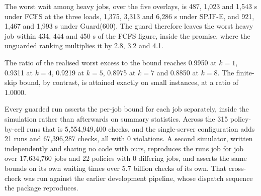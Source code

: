 \documentclass[mathematics,supfile,submit,moreauthors]{Definitions/mdpi}
\newcommand{\devnum}[1]{#1}
\begin{document}
The worst wait among heavy jobs, over the five overlays, is \devnum{487},
\devnum{1{,}023} and \devnum{1{,}543} s under FCFS at the three loads, \devnum{1{,}375},
\devnum{3{,}313} and \devnum{6{,}286} s under SPJF-E, and \devnum{921}, \devnum{1{,}467}
and \devnum{1{,}993} s under Guard($\devnum{600}$). The guard therefore leaves the worst
heavy job within \devnum{434}, \devnum{444} and \devnum{450} s of the FCFS figure, inside
the promise, where the unguarded ranking multiplies it by \devnum{2.8}, \devnum{3.2} and
\devnum{4.1}.

The ratio of the realised worst excess to the bound reaches \devnum{0.9950} at $k = 1$,
\devnum{0.9311} at $k = 4$, \devnum{0.9219} at $k = 5$, \devnum{0.8975} at $k = 7$ and
\devnum{0.8850} at $k = 8$. The finite-skip bound, by contrast, is attained exactly on
small instances, at a ratio of \devnum{1.0000}.

Every guarded run asserts the per-job bound for each job separately, inside the
simulation rather than afterwards on summary statistics. Across the \devnum{315}
policy-by-cell runs that is \devnum{5{,}554{,}949{,}400} checks, and the single-server
configuration adds \devnum{21} runs and \devnum{67{,}396{,}287} checks, all with
\devnum{0} violations. A second simulator, written independently and sharing no code
with ours, reproduces the runs job for job over \devnum{17{,}634{,}760} jobs and
\devnum{22} policies with \devnum{0} differing jobs, and asserts the same bounds on its
own waiting times over \devnum{5.7} billion checks of its own. That cross-check was run
against the earlier development pipeline, whose dispatch sequence the package
reproduces.
\end{document}
